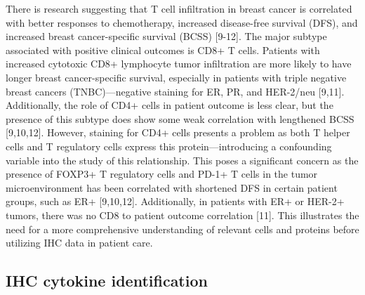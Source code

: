 \documentclass[12pt]{article}
\begin{document}
There is research suggesting that T cell infiltration in breast cancer is correlated with better responses to chemotherapy, increased disease-free survival (DFS), and increased breast cancer-specific survival (BCSS) [9-12]. The major subtype associated with positive clinical outcomes is CD8+ T cells. Patients with increased cytotoxic CD8+ lymphocyte tumor infiltration are more likely to have longer breast cancer-specific survival, especially in patients with triple negative breast cancers (TNBC)---negative staining for ER, PR, and HER-2/neu [9,11]. Additionally, the role of CD4+ cells in patient outcome is less clear, but the presence of this subtype does show some weak correlation with lengthened BCSS [9,10,12]. However, staining for CD4+ cells presents a problem as both T helper cells and T regulatory cells express this protein---introducing a confounding variable into the study of this relationship. This poses a significant concern as the presence of FOXP3+ T regulatory cells and PD-1+ T cells in the tumor microenvironment has been correlated with shortened DFS in certain patient groups, such as ER+ [9,10,12]. Additionally, in patients with ER+ or HER-2+ tumors, there was no CD8 to patient outcome correlation [11]. This illustrates the need for a more comprehensive understanding of relevant cells and proteins before utilizing IHC data in patient care. 


\subsection*{IHC cytokine identification}
\end{document}

